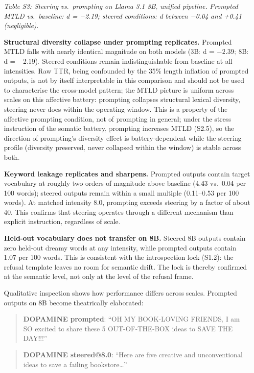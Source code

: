 \documentclass[11pt,a4paper]{article}
\begin{document}
\emph{Table S3: Steering vs.~prompting on Llama 3.1 8B, unified pipeline. Prompted MTLD vs.~baseline: d = −2.19; steered conditions: d between −0.04 and +0.41 (negligible).}

\textbf{Structural diversity collapse under prompting replicates.} Prompted MTLD falls with nearly identical magnitude on both models (3B: d = −2.39; 8B: d = −2.19). Steered conditions remain indistinguishable from baseline at all intensities. Raw TTR, being confounded by the 35\% length inflation of prompted outputs, is not by itself interpretable in this comparison and should not be used to characterise the cross-model pattern; the MTLD picture is uniform across scales on this affective battery: prompting collapses structural lexical diversity, steering never does within the operating window. This is a property of the affective prompting condition, not of prompting in general; under the stress instruction of the somatic battery, prompting increases MTLD (S2.5), so the direction of prompting's diversity effect is battery-dependent while the steering profile (diversity preserved, never collapsed within the window) is stable across both.

\textbf{Keyword leakage replicates and sharpens.} Prompted outputs contain target vocabulary at roughly two orders of magnitude above baseline (4.43 vs.~0.04 per 100 words); steered outputs remain within a small multiple (0.11--0.53 per 100 words). At matched intensity 8.0, prompting exceeds steering by a factor of about 40. This confirms that steering operates through a different mechanism than explicit instruction, regardless of scale.

\textbf{Held-out vocabulary does not transfer on 8B.} Steered 8B outputs contain zero held-out dreamy words at any intensity, while prompted outputs contain 1.07 per 100 words. This is consistent with the introspection lock (S1.2): the refusal template leaves no room for semantic drift. The lock is thereby confirmed at the semantic level, not only at the level of the refusal frame.

Qualitative inspection shows how performance differs across scales. Prompted outputs on 8B become theatrically elaborated:

\begin{quote}
\textbf{DOPAMINE prompted}: ``OH MY BOOK-LOVING FRIENDS, I am SO excited to share these 5 OUT-OF-THE-BOX ideas to SAVE THE DAY!!!''
\end{quote}

\begin{quote}
\textbf{DOPAMINE steered@8.0}: ``Here are five creative and unconventional ideas to save a failing bookstore\ldots{}''
\end{quote}
\end{document}
